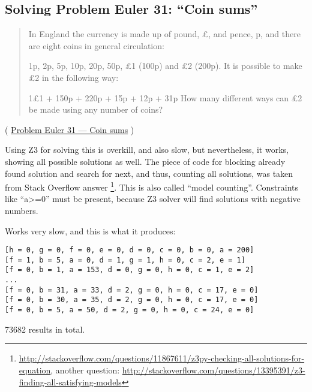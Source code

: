 \subsection{Solving Problem Euler 31: ``Coin sums''}

\begin{framed}
\begin{quotation}
In England the currency is made up of pound, £, and pence, p, and there are eight coins in general circulation:

1p, 2p, 5p, 10p, 20p, 50p, £1 (100p) and £2 (200p).
It is possible to make £2 in the following way:

1£1 + 150p + 220p + 15p + 12p + 31p
How many different ways can £2 be made using any number of coins?
\end{quotation}
\end{framed}
( \href{http://projecteuler.net/problem=31}{Problem Euler 31 --- Coin sums} )

\label{SMTEnumerate}
Using Z3 for solving this is overkill, and also slow, but nevertheless, it works, showing all possible solutions as well.
The piece of code for blocking already found solution and search for next, and thus, counting all solutions, was taken from Stack Overflow answer
\footnote{\url{http://stackoverflow.com/questions/11867611/z3py-checking-all-solutions-for-equation}, 
another question: \url{http://stackoverflow.com/questions/13395391/z3-finding-all-satisfying-models}}.
This is also called ``model counting''.
Constraints like ``a>=0'' must be present, because Z3 solver will find solutions with negative numbers.



Works very slow, and this is what it produces:

\begin{lstlisting}
[h = 0, g = 0, f = 0, e = 0, d = 0, c = 0, b = 0, a = 200]
[f = 1, b = 5, a = 0, d = 1, g = 1, h = 0, c = 2, e = 1]
[f = 0, b = 1, a = 153, d = 0, g = 0, h = 0, c = 1, e = 2]
...
[f = 0, b = 31, a = 33, d = 2, g = 0, h = 0, c = 17, e = 0]
[f = 0, b = 30, a = 35, d = 2, g = 0, h = 0, c = 17, e = 0]
[f = 0, b = 5, a = 50, d = 2, g = 0, h = 0, c = 24, e = 0]
\end{lstlisting}

73682 results in total.
